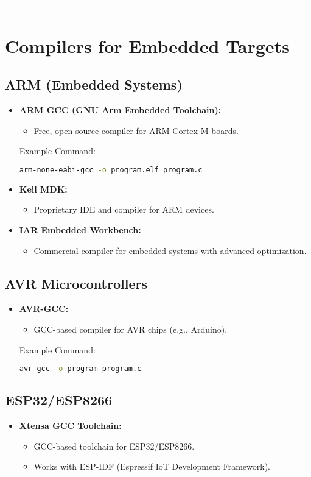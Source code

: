 \documentclass[a4paper,12pt]{article}
\begin{document}
---

\section{Compilers for Embedded Targets}

\subsection{ARM (Embedded Systems)}
\begin{itemize}
\item \textbf{ARM GCC (GNU Arm Embedded Toolchain):}
\begin{itemize}
	\item Free, open-source compiler for ARM Cortex-M boards.
\end{itemize}
Example Command:
\begin{lstlisting}[language=bash]
arm-none-eabi-gcc -o program.elf program.c
\end{lstlisting}

\item \textbf{Keil MDK:}
\begin{itemize}
	\item Proprietary IDE and compiler for ARM devices.
\end{itemize}

\item \textbf{IAR Embedded Workbench:}
\begin{itemize}
	\item Commercial compiler for embedded systems with advanced optimization.
\end{itemize}
\end{itemize}

\subsection{AVR Microcontrollers}
\begin{itemize}
\item \textbf{AVR-GCC:}
\begin{itemize}
	\item GCC-based compiler for AVR chips (e.g., Arduino).
\end{itemize}
Example Command:
\begin{lstlisting}[language=bash]
avr-gcc -o program program.c
\end{lstlisting}
\end{itemize}

\subsection{ESP32/ESP8266}
\begin{itemize}
	\item \textbf{Xtensa GCC Toolchain:}
	\begin{itemize}
		\item GCC-based toolchain for ESP32/ESP8266.
		\item Works with ESP-IDF (Espressif IoT Development Framework).
	\end{itemize}
\end{itemize}
\end{document}
